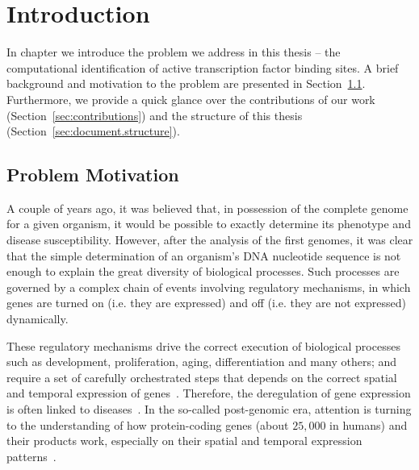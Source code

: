 \chapter{Introduction}
\label{cha:introduction}

\graphicspath{{chapter1/figs/}}

In chapter we introduce the problem we address in this thesis -- the computational identification of active transcription factor binding sites. A brief background and motivation to the problem are presented in Section~\ref{sec:problem.motivation}. Furthermore, we provide a quick glance over the contributions of our work (Section~\ref{sec:contributions}) and the structure of this thesis (Section~\ref{sec:document.structure}).

\section{Problem Motivation}
\label{sec:problem.motivation}

A couple of years ago, it was believed that, in possession of the complete genome for a given organism, it would be possible to exactly determine its phenotype and disease susceptibility. However, after the analysis of the first genomes, it was clear that the simple determination of an organism's DNA nucleotide sequence is not enough to explain the great diversity of biological processes. Such processes are governed by a complex chain of events involving regulatory mechanisms, in which genes are turned on (i.e. they are expressed) and off (i.e. they are not expressed) dynamically.

These regulatory mechanisms drive the correct execution of biological processes such as development, proliferation, aging, differentiation and many others; and require a set of carefully orchestrated steps that depends on the correct spatial and temporal expression of genes~\cite{maston2006}. Therefore, the deregulation of gene expression is often linked to diseases~\cite{encode2012}. In the so-called post-genomic era, attention is turning to the understanding of how protein-coding genes (about $25,000$ in humans) and their products work, especially on their spatial and temporal expression patterns~\cite{maston2006}.


